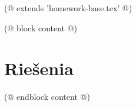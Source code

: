 (@ extends 'homework-base.tex' @)

(@ block content @)
    
    \newpage
    \setcounter{section}{(* issue.number - 1 *)}
    \section{Riešenia}
    
(@ endblock content @)
